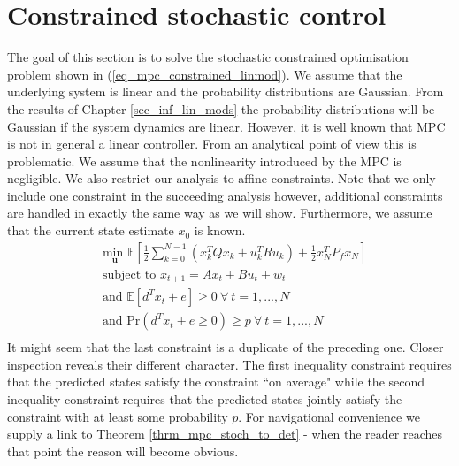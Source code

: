 \section{Constrained stochastic control}
\label{sec_lin_mpc_constained}
The goal of this section is to solve the stochastic constrained optimisation problem shown in (\ref{eq_mpc_constrained_linmod}). We assume that the underlying system is linear and the probability distributions are Gaussian. From the results of Chapter \ref{sec_inf_lin_mods} the probability distributions will be Gaussian if the system dynamics are linear. However, it is well known \cite{mac} that MPC is not in general a linear controller. From an analytical point of view this is problematic. We assume that the nonlinearity introduced by the MPC is negligible. We also restrict our analysis to affine constraints. Note that we only include one constraint in the succeeding analysis however, additional constraints are handled in exactly the same way as we will show. Furthermore, we assume that the current state estimate $x_0$ is known.
\begin{equation}
\begin{aligned}
&\underset{\mathbf{u}}{\text{min }} \mathbb{E}\left[ \frac{1}{2}\sum_{k=0}^{N-1} \left( x_k^TQx_k + u_k^TRu_k \right) + \frac{1}{2}x_N^TP_fx_N \right] \\
& \text{subject to } x_{t+1}=Ax_t+Bu_t + w_t \\
& \text{and } \mathbb{E}[d^Tx_t + e] \geq 0 ~\forall ~t=1,...,N \\
& \text{and } \text{Pr}(d^Tx_t + e \geq 0) \geq p ~\forall ~t=1,...,N\\
\end{aligned}
\label{eq_mpc_constrained_linmod}
\end{equation}
It might seem that the last constraint is a duplicate of the preceding one. Closer inspection reveals their different character. The first inequality constraint requires that the predicted states satisfy the constraint ``on average" while the second inequality constraint requires that the predicted states jointly satisfy the constraint with at least some probability $p$. For navigational convenience we supply a link to Theorem \ref{thrm_mpc_stoch_to_det} - when the reader reaches that point the reason will become obvious.

